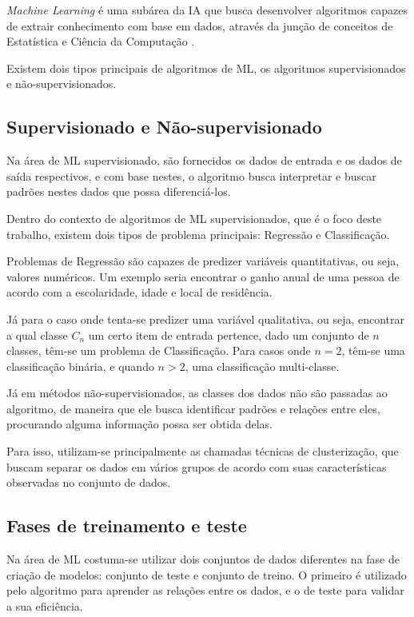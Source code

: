 \textit{Machine Learning} é uma subárea da IA que busca desenvolver algoritmos capazes de extrair conhecimento com base em dados, através da junção de conceitos de Estatística e Ciência da Computação \cite{James:2014:ISL:2517747}. 

Existem dois tipos principais de algoritmos de ML, os algoritmos supervisionados e não-supervisionados.

\subsection{Supervisionado e Não-supervisionado}

Na área de ML supervisionado, são fornecidos os dados de entrada e os dados de saída respectivos, e com base nestes, o algoritmo busca interpretar e buscar padrões nestes dados que possa diferenciá-los. 

Dentro do contexto de algoritmos de ML supervisionados, que é o foco deste trabalho, existem dois tipos de problema principais: Regressão e Classificação.

Problemas de Regressão são capazes de predizer variáveis quantitativas, ou seja, valores numéricos. Um exemplo seria encontrar o ganho anual de uma pessoa de acordo com a escolaridade, idade e local de residência. \cite{muller2017introduction} 

Já para o caso onde tenta-se predizer uma variável qualitativa, ou seja, encontrar a qual classe $C_{n}$ um certo item de entrada pertence, dado um conjunto de $n$ classes, têm-se um problema de Classificação. Para casos onde $n=2$, têm-se uma classificação binária, e quando $n>2$, uma classificação multi-classe.

Já em métodos não-supervisionados, as classes dos dados não são passadas ao algoritmo, de maneira que ele busca identificar padrões e relações entre eles, procurando alguma informação possa ser obtida delas. 

Para isso, utilizam-se principalmente as chamadas técnicas de clusterização, que buscam separar os dados em vários grupos de acordo com suas características observadas no conjunto de dados. \cite{muller2017introduction} 

\subsection{Fases de treinamento e teste}

Na área de ML costuma-se utilizar dois conjuntos de dados diferentes na fase de criação de modelos: conjunto de teste e conjunto de treino. O primeiro é utilizado pelo algoritmo para aprender as relações entre os dados, e o de teste para validar a sua eficiência.

